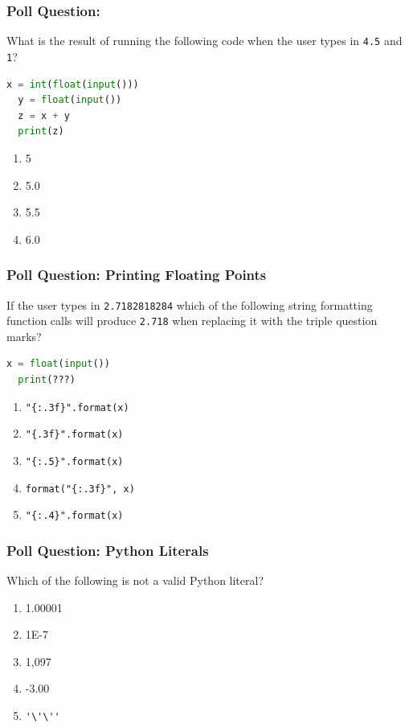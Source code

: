 \documentclass{beamer}
\begin{document}
%
%
%
\begin{frame}[fragile]
  \frametitle{Poll Question: }
  What is the result of running the following code when the user types in \lstinline|4.5| and \lstinline|1|?
  \begin{lstlisting}[language=Python]
  x = int(float(input()))
  y = float(input())
  z = x + y
  print(z)
  \end{lstlisting}
  \vfill
  \begin{enumerate}[A]
    \item 5
    \item 5.0
    \item 5.5
    \item 6.0
  \end{enumerate}
\end{frame}

%
%
%
\begin{frame}[fragile]
  \frametitle{Poll Question: Printing Floating Points}
  If the user types in \lstinline|2.7182818284| which of the following string formatting function calls will produce \lstinline|2.718| when replacing it with the triple question marks?
  \begin{lstlisting}[language=Python]
  x = float(input())
  print(???)
  \end{lstlisting}
  \vfill
  \begin{enumerate}[A]
    \item \lstinline|"{:.3f}".format(x)|
    \item \lstinline|"{.3f}".format(x)|
    \item \lstinline|"{:.5}".format(x)|
    \item \lstinline|format("{:.3f}", x)|
    \item \lstinline|"{:.4}".format(x)|
  \end{enumerate}
\end{frame}

%
%
%
\begin{frame}[fragile]
  \frametitle{Poll Question: Python Literals}
  Which of the following is not a valid Python literal?
  \begin{enumerate}[A]
    \item 1.00001
    \item 1E-7
    \item 1,097
    \item -3.00
    \item \lstinline{'\'\''}
  \end{enumerate}
\end{frame}
\end{document}

